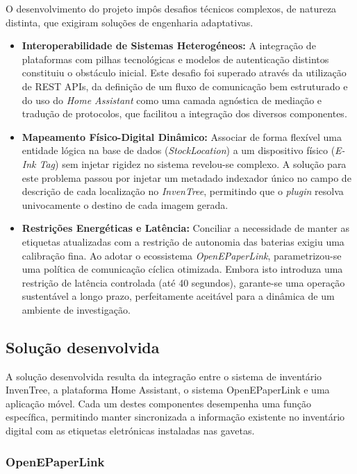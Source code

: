 \documentclass[10pt]{article}
\begin{document}
O desenvolvimento do projeto impôs desafios técnicos complexos, de natureza distinta, que exigiram soluções de engenharia adaptativas.

\begin{itemize}
    \item \textbf{Interoperabilidade de Sistemas Heterogéneos:} A integração de plataformas com pilhas tecnológicas e modelos de autenticação distintos constituiu o obstáculo inicial. Este desafio foi superado através da utilização de REST APIs, da definição de um fluxo de comunicação bem estruturado e do uso do \textit{Home Assistant} como uma camada agnóstica de mediação e tradução de protocolos, que facilitou a integração dos diversos componentes.
    \item \textbf{Mapeamento Físico-Digital Dinâmico:} Associar de forma flexível uma entidade lógica na base de dados (\textit{StockLocation}) a um dispositivo físico (\textit{E-Ink Tag}) sem injetar rigidez no sistema revelou-se complexo. A solução para este problema passou por injetar um metadado indexador único no campo de descrição de cada localização no \textit{InvenTree}, permitindo que o \textit{plugin} resolva univocamente o destino de cada imagem gerada.
    \item \textbf{Restrições Energéticas e Latência:} Conciliar a necessidade de manter as etiquetas atualizadas com a restrição de autonomia das baterias exigiu uma calibração fina. Ao adotar o ecossistema \textit{OpenEPaperLink}, parametrizou-se uma política de comunicação cíclica otimizada. Embora isto introduza uma restrição de latência controlada (até 40 segundos), garante-se uma operação sustentável a longo prazo, perfeitamente aceitável para a dinâmica de um ambiente de investigação.
\end{itemize}
\subsection{Solução desenvolvida}

A solução desenvolvida resulta da integração entre o sistema de inventário InvenTree, a plataforma Home Assistant, o sistema OpenEPaperLink e uma aplicação móvel. Cada um destes componentes desempenha uma função específica, permitindo manter sincronizada a informação existente no inventário digital com as etiquetas eletrónicas instaladas nas gavetas.

\subsubsection{OpenEPaperLink}
\end{document}
